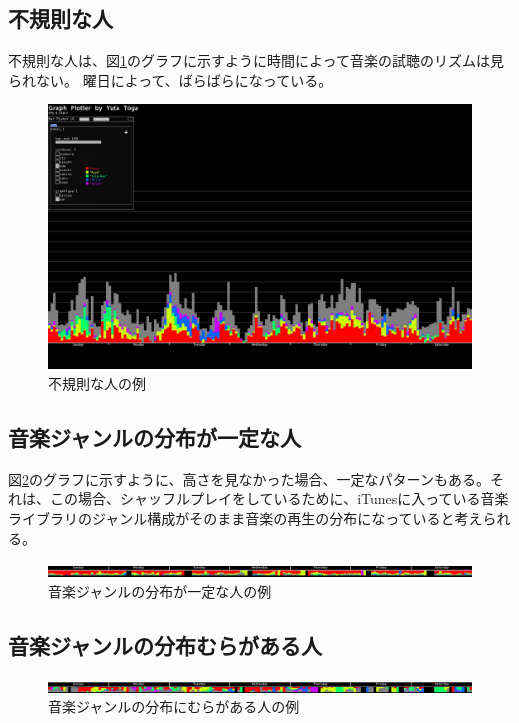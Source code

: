 \documentclass{jsarticle}
\begin{document}
\subsection{不規則な人}
不規則な人は、図\ref{sample_irregular}のグラフに示すように時間によって音楽の試聴のリズムは見られない。
曜日によって、ばらばらになっている。

\begin{figure}[h]
\begin{center}
\includegraphics[width=14cm]{sample_irregular.jpg}
\caption{不規則な人の例}
\label{sample_irregular}
\end{center}
\end{figure}

\subsection{音楽ジャンルの分布が一定な人}
図\ref{genreMap_regular}のグラフに示すように、高さを見なかった場合、一定なパターンもある。それは、この場合、シャッフルプレイをしているために、iTunesに入っている音楽ライブラリのジャンル構成がそのまま音楽の再生の分布になっていると考えられる。

\begin{figure}[h]
\begin{center}
\includegraphics[width=14cm]{genreMap_regular.jpg}
\caption{音楽ジャンルの分布が一定な人の例}
\label{genreMap_regular}
\end{center}
\end{figure}


\subsection{音楽ジャンルの分布むらがある人}
\begin{figure}[h]
\begin{center}
\includegraphics[width=14cm]{genreMap_irregular.jpg}
\caption{音楽ジャンルの分布にむらがある人の例}
\label{genreMap_irregular}
\end{center}
\end{figure}
\end{document}
